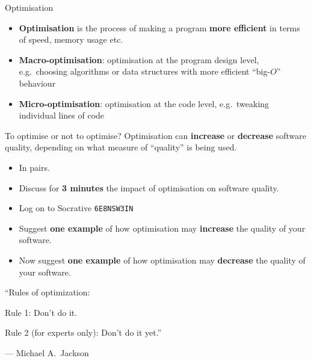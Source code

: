 
\begin{frame}{Optimisation}
	\begin{itemize}
		\item \textbf{Optimisation} is the process of making a program \textbf{more efficient}
			in terms of speed, memory usage etc. \pause
		\item \textbf{Macro-optimisation}: optimisation at the program design level,
			e.g.\ choosing algorithms or data structures with more efficient ``big-$O$'' behaviour \pause
		\item \textbf{Micro-optimisation}: optimisation at the code level,
			e.g.\ tweaking individual lines of code
	\end{itemize}
\end{frame}

\begin{frame}{To optimise or not to optimise?}
	Optimisation can \textbf{increase} or \textbf{decrease} software quality,
	depending on what measure of ``quality'' is being used. \pause
	\begin{itemize}
		\item In pairs.
		\item Discuss for \textbf{3 minutes} the impact of optimisation on software quality.
		\item Log on to Socrative \texttt{6E8NSW3IN}
		\item Suggest \textbf{one example} of how optimisation may \textbf{increase} the quality of your software. \pause
		\item Now suggest \textbf{one example} of how optimisation may \textbf{decrease} the quality of your software.
	\end{itemize}
\end{frame}

\begin{frame}
	\pause
	\begin{center}
		``Rules of optimization:
		
		Rule 1: Don't do it.
		
		Rule 2 (for experts only): Don't do it yet.''
	\end{center}
	\begin{flushright}
		--- Michael A.\ Jackson
	\end{flushright}
\end{frame}

